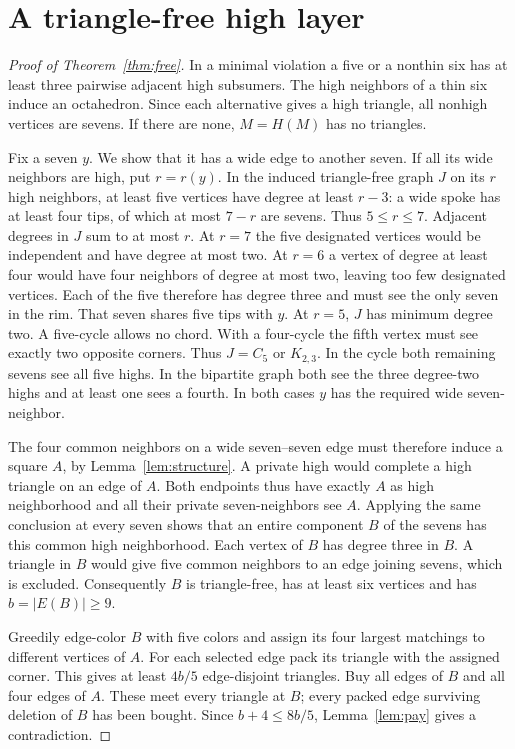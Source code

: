 \documentclass[11pt,a4paper]{amsart}
\begin{document}
\section{A triangle-free high layer}\label{sec:free}
\begin{proof}[Proof of Theorem~\ref{thm:free}]
In a minimal violation a five or a nonthin six has at least three
pairwise adjacent high subsumers. The high neighbors of a thin six
induce an octahedron. Since each alternative gives a high triangle,
all nonhigh vertices are sevens. If there are none, $M=H(M)$
has no triangles.

Fix a seven $y$. We show that it has a wide edge to another seven.
If all its wide neighbors are high, put $r=r(y)$. In the induced
triangle-free graph $J$ on its $r$ high neighbors, at least five
vertices have degree at least $r-3$: a wide spoke has at least
four tips, of which at most $7-r$ are sevens. Thus $5\le r\le7$.
Adjacent degrees in $J$ sum to at most $r$. At $r=7$ the five
designated vertices would be independent and have degree at most
two. At $r=6$ a vertex of degree at least four would have four
neighbors of degree at most two, leaving too few designated
vertices. Each of the five therefore has degree three and must
see the only seven in the rim. That seven shares five tips with
$y$. At $r=5$, $J$ has minimum degree two. A five-cycle allows
no chord. With a four-cycle the fifth vertex must see exactly two
opposite corners. Thus $J=C_5$ or $K_{2,3}$. In the cycle both
remaining sevens see all five highs. In the bipartite graph both
see the three degree-two highs and at least one sees a fourth.
In both cases $y$ has the required wide seven-neighbor.

The four common neighbors on a wide seven--seven edge must
therefore induce a square $A$, by Lemma~\ref{lem:structure}.
A private high would complete a high triangle on an edge of $A$.
Both endpoints thus have exactly $A$ as high neighborhood and
all their private seven-neighbors see $A$. Applying the same
conclusion at every seven shows that an entire component $B$ of
the sevens has this common high neighborhood. Each vertex of
$B$ has degree three in $B$. A triangle in $B$ would give five
common neighbors to an edge joining sevens, which is excluded.
Consequently $B$ is triangle-free, has at least six vertices
and has $b=|E(B)|\ge9$.

Greedily edge-color $B$ with five colors and assign its four
largest matchings to different vertices of $A$. For each selected
edge pack its triangle with the assigned corner. This gives at
least $4b/5$ edge-disjoint triangles. Buy all edges of $B$ and
all four edges of $A$. These meet every triangle at $B$; every
packed edge surviving deletion of $B$ has been bought.
Since $b+4\le8b/5$, Lemma~\ref{lem:pay} gives a contradiction.
\end{proof}
\end{document}
